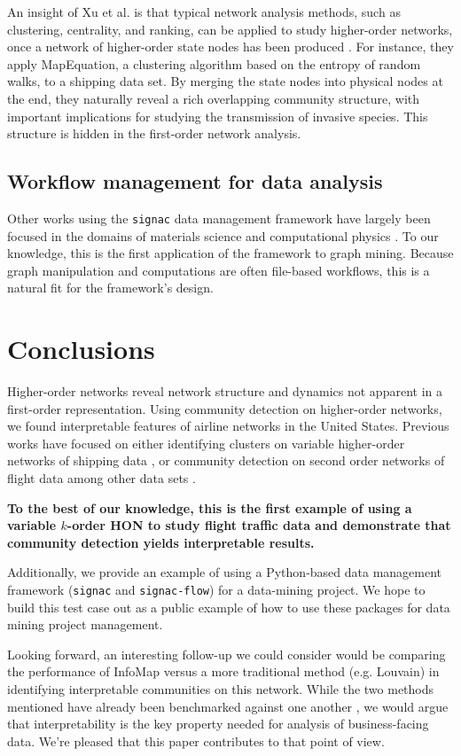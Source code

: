 \documentclass[sigconf]{acmart}
\begin{document}
An insight of Xu et al. is that typical network analysis methods, such as clustering, centrality, and ranking, can be applied to study higher-order networks, once a network of higher-order state nodes has been produced \cite{Xu2016}. For instance, they apply MapEquation, a clustering algorithm based on the entropy of random walks, to a shipping data set. By merging the state nodes into physical nodes at the end, they naturally reveal a rich overlapping community structure, with important implications for studying the transmission of invasive species. This structure is hidden in the first-order network analysis.

\subsection{Workflow management for data analysis}
Other works using the \texttt{signac} data management framework have largely been focused in the domains of materials science and computational physics \cite{signac_commat,Teich2019,Thompson2019}. To our knowledge, this is the first application of the framework to graph mining. Because graph manipulation and computations are often file-based workflows, this is a natural fit for the framework's design.

\section{Conclusions}
Higher-order networks reveal network structure and dynamics not apparent in a first-order representation. Using community detection on higher-order networks, we found interpretable features of airline networks in the United States. Previous works have focused on either identifying clusters on variable higher-order networks of shipping data \cite{Xu2016}, or community detection on second order networks of flight data among other data sets \cite{Rosvall2014}. 

\textbf{To the best of our knowledge, this is the first example of using a variable $k$-order HON to study flight traffic data and demonstrate that community detection yields interpretable results.}

Additionally, we provide an example of using a Python-based data management framework (\texttt{signac} and \texttt{signac-flow}) for a data-mining project. We hope to build this test case out as a public example of how to use these packages for data mining project management. 

Looking forward, an interesting follow-up we could consider would be comparing the performance of InfoMap versus a more traditional method (e.g. Louvain) in identifying interpretable communities on this network. While the two methods mentioned have already been benchmarked against one another \cite{Rosvall2014}, we would argue that interpretability is the key property needed for analysis of business-facing data. We're pleased that this paper contributes to that point of view.
\end{document}
